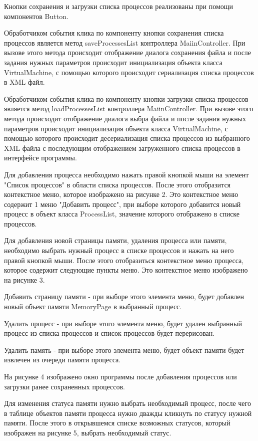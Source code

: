 \documentclass[russian,utf8,simple,hpadding=10mm,vpadding=20mm]{eskdtext}
\begin{document}
Кнопки сохранения и загрузки списка процессов реализованы при помощи компонентов Button.

Обработчиком события клика по компоненту кнопки сохранения списка процессов является метод saveProcessesList контроллера MaiinController. При вызове этого метода происходит отображение диалога сохранения файла и после задания нужных параметров происходит инициализация объекта класса VirtualMachine, с помощью которого происходит сериализация списка процессов в XML файл.

Обработчиком события клика по компоненту кнопки загрузки списка процессов является метод loadProcessesList контроллера MaiinController. При вызове этого метода происходит отображение диалога выбра файла и после задания нужных параметров происходит инициализация объекта класса VirtualMachine, с помощью которого происходит десериализация списка процессов из выбранного XML файла с последующим отображением загруженного списка процессов в интерфейсе программы.
 
Для добавления процесса необходимо нажать правой кнопкой мыши на элемент "Список процессов" в области списка процессов. После этого отобразится контекстное меню, которое изображено на рисунке 2. Это контекстное меню содержит 1 меню "Добавить процесс", при выборе которого добавится новый процесс в объект класса ProcessList, значение которого отображено в списке процессов. 

Для добавления новой страницы памяти, удаления процесса или памяти, необходимо выбрать нужный процесс в списке процессов и нажать на него правой кнопкой мыши. После этого отобразиться контекстное меню процесса, которое содержит следующие пункты меню. Это контекстное меню изображено на рисунке 3.

Добавить страницу памяти - при выборе этого элемента меню, будет добавлен новый объект памяти MemoryPage в выбранный процесс.

Удалить процесс - при выборе этого элемента меню, будет удален выбранный процесс из списка процессов и список процессов будет перерисован.

Удалить память - при выборе этого элемента меню, будет объект памяти будет извлечен из очереди памяти процесса.

На рисунке 4 изображено окно программы после добавления процессов или загрузки ранее сохраненных процессов.

Для изменения статуса памяти нужно выбрать необходимый процесс, после чего в таблице объектов памяти процесса нужно дважды кликнуть по статусу нужной памяти. После этого в открывшемся списке возможных статусов, который изображен на рисунке 5, выбрать необходимый статус.
\end{document}
